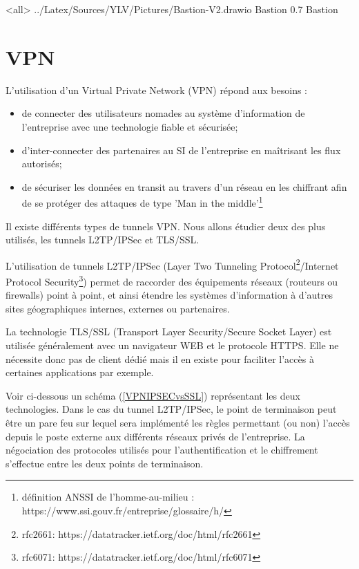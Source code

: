 \mode<all>{\picframe
{../Latex/Sources/YLV/Pictures/Bastion-V2.drawio}%
{Bastion} %
{0.7} %
{Bastion} %
}

\section{VPN}

L'utilisation d'un Virtual Private Network (VPN) répond aux besoins :
\begin{itemize}
    \item de connecter des utilisateurs nomades au système d'information de l'entreprise avec une technologie fiable et sécurisée;
    \item d'inter-connecter des partenaires au SI de l'entreprise en maîtrisant les flux autorisés;
    \item de sécuriser les données en transit au travers d'un réseau en les chiffrant afin de se protéger des attaques de type 'Man in the middle'\footnote{définition ANSSI de l'homme-au-milieu : https://www.ssi.gouv.fr/entreprise/glossaire/h/}
\end{itemize}

Il existe différents types de tunnels VPN. Nous allons étudier deux des plus utilisés, les tunnels L2TP/IPSec et TLS/SSL.

L'utilisation de tunnels L2TP/IPSec (Layer Two Tunneling Protocol\footnote{rfc2661: https://datatracker.ietf.org/doc/html/rfc2661}/Internet Protocol Security\footnote{rfc6071: https://datatracker.ietf.org/doc/html/rfc6071}) permet de raccorder des équipements réseaux (routeurs ou firewalls) point à point, et ainsi étendre les systèmes d'information à d'autres sites géographiques internes, externes ou partenaires.

La technologie TLS/SSL (Transport Layer Security/Secure Socket Layer) est utilisée généralement avec un navigateur WEB et le protocole HTTPS. Elle ne nécessite donc pas de client dédié mais il en existe pour faciliter l'accès à certaines applications par exemple.

Voir ci-dessous un schéma (\ref{VPNIPSECvsSSL}) représentant les deux technologies.
Dans le cas du tunnel L2TP/IPSec, le point de terminaison peut être un pare feu sur lequel sera implémenté les règles permettant (ou non) l'accès depuis le poste externe aux différents réseaux privés de l'entreprise. La négociation des protocoles utilisés pour l'authentification et le chiffrement s'effectue entre les deux points de terminaison.

